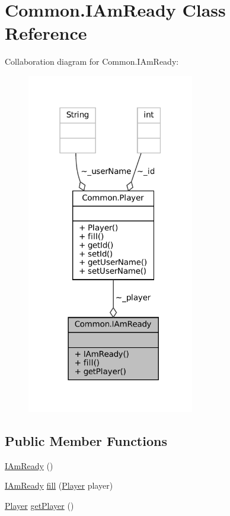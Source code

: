 \hypertarget{classCommon_1_1IAmReady}{}\section{Common.\+I\+Am\+Ready Class Reference}
\label{classCommon_1_1IAmReady}


Collaboration diagram for Common.\+I\+Am\+Ready\+:
\nopagebreak
\begin{figure}[H]
\begin{center}
\leavevmode
\includegraphics[width=207pt]{classCommon_1_1IAmReady__coll__graph}
\end{center}
\end{figure}
\subsection*{Public Member Functions}
\begin{DoxyCompactItemize}
\item 
\mbox{\hyperlink{classCommon_1_1IAmReady_a852717589cc197c66d331b859c43d0ed}{I\+Am\+Ready}} ()
\item 
\mbox{\hyperlink{classCommon_1_1IAmReady}{I\+Am\+Ready}} \mbox{\hyperlink{classCommon_1_1IAmReady_afb8287607db59d4e6006d7c6739604fa}{fill}} (\mbox{\hyperlink{classCommon_1_1Player}{Player}} player)
\item 
\mbox{\hyperlink{classCommon_1_1Player}{Player}} \mbox{\hyperlink{classCommon_1_1IAmReady_ad4ca10a7f3e52aa2f032d755d68e79d6}{get\+Player}} ()
\end{DoxyCompactItemize}


